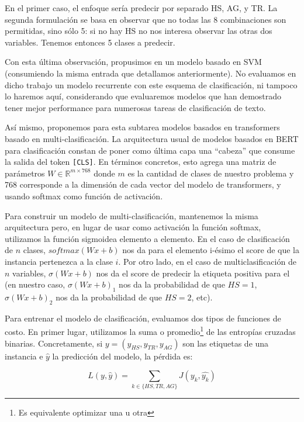 En el primer caso, el enfoque sería predecir por separado HS, AG, y TR. La segunda formulación se basa en observar que no todas las 8 combinaciones son permitidas, sino sólo 5: si no hay HS no nos interesa observar las otras dos variables. Tenemos entonces 5 clases a predecir.

Con esta última observación, propusimos en \citet{atalaya_tass2018} un modelo basado en SVM (consumiendo la misma entrada que detallamos anteriormente). No evaluamos en dicho trabajo un modelo recurrente con este esquema de clasificación, ni tampoco lo haremos aquí, considerando que evaluaremos modelos que han demostrado tener mejor performance para numerosas tareas de clasificación de texto.

Así mismo, proponemos para esta subtarea modelos basados en transformers basado en multi-clasificación. La arquitectura usual de modelos basados en BERT para clasificación constan de poner como última capa una  ``cabeza'' que consume la salida del token \verb|[CLS]|. En términos concretos, esto agrega una matriz de parámetros $W \in \mathbb{R}^{m \times 768}$ donde $m$ es la cantidad de clases de nuestro problema y 768 corresponde a la dimensión de cada vector del modelo de transformers, y usando softmax como función de activación.

Para construir un modelo de multi-clasificación, mantenemos la misma arquitectura pero, en lugar de usar como activación la función softmax, utilizamos la función sigmoidea elemento a elemento. En el caso de clasificación de $n$ clases, $softmax(W x + b)$ nos da para el elemento i-ésimo el score de que la instancia pertenezca a la clase $i$. Por otro lado, en el caso de multiclasificación de $n$ variables, $\sigma(W x + b)$ nos da el score de predecir la etiqueta positiva para el (en nuestro caso,  $\sigma(W x + b)_1$ nos da la probabilidad de que $HS = 1$,  $\sigma(W x + b)_2$ nos da la probabilidad de que $HS = 2$, etc).

Para entrenar el modelo de clasificación, evaluamos dos tipos de funciones de costo. En primer lugar, utilizamos la suma o promedio\footnote{Es equivalente optimizar una u otra} de las entropías cruzadas binarias. Concretamente, si $y = (y_{HS}, y_{TR}, y_{AG})$ son las etiquetas de una instancia e $\widehat{y}$ la predicción del modelo, la pérdida es:

\begin{equation}
\label{eq:multi_loss}
L(y, \widehat{y}) = \sum\limits_{k \in \{HS, TR, AG\}} J(y_k, \widehat{y_k})
\end{equation}

